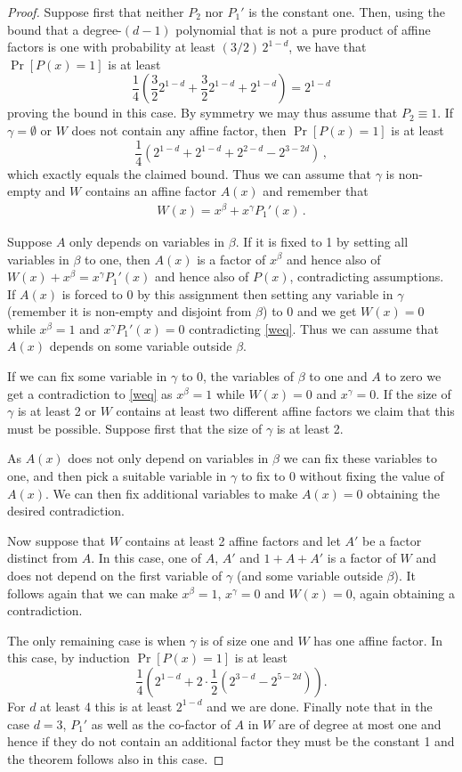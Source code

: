 \documentclass[10pt]{article}
\theoremstyle{definition}
\numberwithin{equation}{section}
\begin{document}
\begin{proof}
Suppose first that neither $P_2$ nor $P_1'$ is
the constant one.
Then, using the bound that a 
%
degree-$(d-1)$
polynomial that
is not a pure product of affine factors is one with
probability at least $(3/2)\,2^{1-d}$, we have
that $\Pr[P(x)=1]$ is at least
$$
\frac 14 \left(\frac 32 2^{1-d}+\frac 32 2^{1-d}+2^{1-d}\right)= 2^{1-d}
$$
proving the bound in this case.
By symmetry we may thus assume 
that $P_2\equiv 1$.
If $\gamma=\emptyset$
or $W$ does not contain any affine factor,
then $\Pr[P(x)=1]$ is at least
$$
\frac 14 (2^{1-d}+2^{1-d}+2^{2-d}-2^{3-2d})\,,
$$
which exactly equals the claimed bound.
Thus we can assume that $\gamma$ is non-empty
and $W$ contains an affine factor $A(x)$ and remember
that \begin{eqnarray}\label{weq}
W(x)=x^\beta + x^\gamma P_1'(x)\,.
\end{eqnarray}

Suppose $A$ only depends
on variables in $\beta$.  If it is fixed to
1 by setting all variables in $\beta$
to one, then $A(x)$ is a factor of $x^\beta$
and hence also of $W(x)+x^\beta=x^\gamma P_1'(x)$
and hence also of $P(x)$, contradicting assumptions.
If $A(x)$ is forced to 0 by this assignment
then setting any variable
in $\gamma$ (remember it is non-empty and disjoint
from $\beta$) to 0 and we get $W(x)=0$ while
$x^\beta=1$ and $x^\gamma P_1'(x)=0$ contradicting
\eqref{weq}.  Thus we can assume
that $A(x)$ depends on some variable
outside $\beta$.

If we can fix some variable in $\gamma$ to 0,
the variables of $\beta$ to one and $A$ to zero
we get a contradiction to \eqref{weq} as
$x^\beta=1$ while $W(x)=0$ and $x^\gamma=0$.
If the size of $\gamma$ is
at least 2 or $W$ contains at least two different
affine factors we claim that this must be possible.  Suppose first
that the size of $\gamma$ is at least 2.

As $A(x)$ does not only depend on variables
in $\beta$ we can fix these variables to
one, and then pick a suitable variable
in $\gamma$ to fix to 0 without fixing
the value of $A(x)$. We can then fix
additional variables to make $A(x)=0$
obtaining the desired contradiction.

Now suppose that $W$ contains at least
2 affine factors and let $A'$ be a factor distinct
from $A$.  In this case,
one of $A$, $A'$ and $1+A+A'$ is
a factor of $W$ and does not
depend on the first variable of $\gamma$
(and some variable outside $\beta$).
It follows again that we can
make $x^\beta=1$, $x^\gamma=0$ and $W(x)=0$,
again obtaining a contradiction.

The only remaining case is when $\gamma$ is
of size one and $W$ has one affine factor.
In this case, by induction
$\Pr[P(x)=1]$ is at least
$$
\frac 14 \left(2^{1-d}+ 2\cdot \frac 12 \left(2^{3-d}-2^{5-2d}\right)\right).
$$
For $d$ at least 4 this is at least $2^{1-d}$
and we are done.  Finally note that in the
case $d=3$, $P_1'$ as well as the co-factor
of $A$ in $W$ are of degree at most one
and hence if they do not contain an
additional factor they must be the constant
1 and the theorem follows also in this case.
\end{proof}
\end{document}

